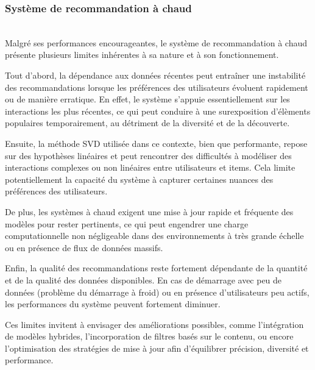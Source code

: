 \documentclass{article}
\begin{document}
\subsubsection{Système de recommandation à chaud}
$ $\\
Malgré ses performances encourageantes, le système de recommandation à chaud présente plusieurs limites inhérentes à sa nature et à son fonctionnement.

Tout d’abord, la dépendance aux données récentes peut entraîner une instabilité des recommandations lorsque les préférences des utilisateurs évoluent rapidement ou de manière erratique. En effet, le système s’appuie essentiellement sur les interactions les plus récentes, ce qui peut conduire à une surexposition d’élèments populaires temporairement, au détriment de la diversité et de la découverte.

Ensuite, la méthode SVD utilisée dans ce contexte, bien que performante, repose sur des hypothèses linéaires et peut rencontrer des difficultés à modéliser des interactions complexes ou non linéaires entre utilisateurs et items. Cela limite potentiellement la capacité du système à capturer certaines nuances des préférences des utilisateurs.

De plus, les systèmes à chaud exigent une mise à jour rapide et fréquente des modèles pour rester pertinents, ce qui peut engendrer une charge computationnelle non négligeable dans des environnements à très grande échelle ou en présence de flux de données massifs.

Enfin, la qualité des recommandations reste fortement dépendante de la quantité et de la qualité des données disponibles. En cas de démarrage avec peu de données (problème du démarrage à froid) ou en présence d’utilisateurs peu actifs, les performances du système peuvent fortement diminuer.

Ces limites invitent à envisager des améliorations possibles, comme l’intégration de modèles hybrides, l’incorporation de filtres basés sur le contenu, ou encore l’optimisation des stratégies de mise à jour afin d’équilibrer précision, diversité et performance.
\end{document}
